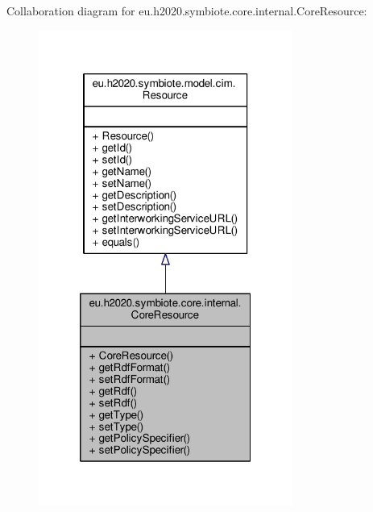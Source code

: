 Collaboration diagram for eu.\+h2020.\+symbiote.\+core.\+internal.\+Core\+Resource\+:
\nopagebreak
\begin{figure}[H]
\begin{center}
\leavevmode
\includegraphics[width=236pt]{classeu_1_1h2020_1_1symbiote_1_1core_1_1internal_1_1CoreResource__coll__graph}
\end{center}
\end{figure}
